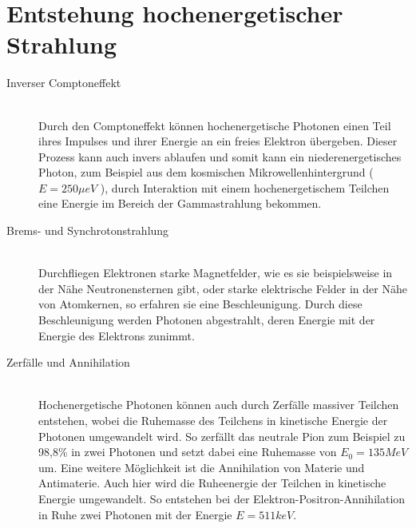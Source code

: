 \section{Entstehung hochenergetischer Strahlung}
\begin{description}
\item[Inverser Comptoneffekt]\hfill \\
Durch den Comptoneffekt können hochenergetische Photonen einen Teil ihres Impulses und ihrer Energie an ein freies Elektron übergeben. Dieser Prozess kann auch invers ablaufen und somit kann ein niederenergetisches Photon, zum Beispiel aus dem kosmischen Mikrowellenhintergrund ($E=250\unit{\mu eV}$ \cite{Grupen}), durch Interaktion mit einem hochenergetischem Teilchen eine Energie im Bereich der Gammastrahlung bekommen.
\item[Brems- und Synchrotonstrahlung]\hfill \\
Durchfliegen Elektronen starke Magnetfelder, wie es sie beispielsweise in der Nähe Neutronensternen gibt, oder starke elektrische Felder in der Nähe von Atomkernen, so erfahren sie eine Beschleunigung. Durch diese Beschleunigung werden Photonen abgestrahlt, deren Energie mit der Energie des Elektrons zunimmt.
\item[Zerfälle und Annihilation]\hfill \\ 
Hochenergetische Photonen können auch durch Zerfälle massiver Teilchen entstehen, wobei die Ruhemasse des Teilchens in kinetische Energie der Photonen umgewandelt wird. So zerfällt das neutrale Pion zum Beispiel zu 98,8\%  in zwei Photonen und setzt dabei eine Ruhemasse von $E_0=135\unit{MeV}$ \cite{PDG} um. Eine weitere Möglichkeit ist die Annihilation von Materie und Antimaterie. Auch hier wird die Ruheenergie der Teilchen in kinetische Energie umgewandelt. So entstehen bei der Elektron-Positron-Annihilation in Ruhe zwei Photonen mit der Energie $E=511\unit{keV}$.
\end{description}

